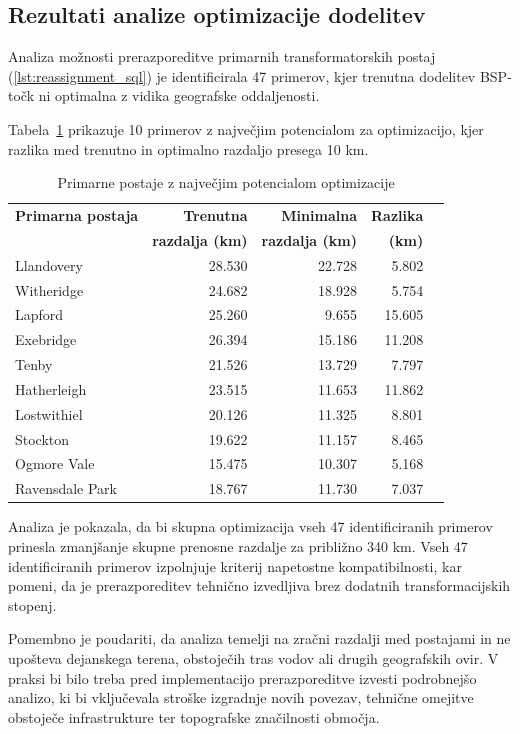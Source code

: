 \documentclass[a4paper,12pt,openright]{book}
\begin{document}
\subsection{Rezultati analize optimizacije dodelitev}

Analiza možnosti prerazporeditve primarnih transformatorskih postaj (\ref{lst:reassignment_sql}) je identificirala 47 primerov, kjer trenutna dodelitev BSP-točk ni optimalna z vidika geografske oddaljenosti.

Tabela~\ref{tab:reassignment_summary} prikazuje 10 primerov z največjim potencialom za optimizacijo, kjer razlika med trenutno in optimalno razdaljo presega 10 km.

\begin{table}[h]
\centering
\caption{Primarne postaje z največjim potencialom optimizacije}
\label{tab:reassignment_summary}
\begin{tabular}{lrrrr}
\hline
\textbf{Primarna postaja} & \textbf{Trenutna} & \textbf{Minimalna} & \textbf{Razlika} \\
 & \textbf{razdalja (km)} & \textbf{razdalja (km)} & \textbf{(km)} \\
\hline
Llandovery & 28.530 & 22.728 & 5.802 \\
Witheridge & 24.682 & 18.928 & 5.754 \\
Lapford & 25.260 & 9.655 & 15.605 \\
Exebridge & 26.394 & 15.186 & 11.208 \\
Tenby & 21.526 & 13.729 & 7.797 \\
Hatherleigh & 23.515 & 11.653 & 11.862 \\
Lostwithiel & 20.126 & 11.325 & 8.801 \\
Stockton & 19.622 & 11.157 & 8.465 \\
Ogmore Vale & 15.475 & 10.307 & 5.168 \\
Ravensdale Park & 18.767 & 11.730 & 7.037 \\
\hline
\end{tabular}
\end{table}

Analiza je pokazala, da bi skupna optimizacija vseh 47 identificiranih primerov prinesla zmanjšanje skupne prenosne razdalje za približno 340 km. Vseh 47 identificiranih primerov izpolnjuje kriterij napetostne kompatibilnosti, kar pomeni, da je prerazporeditev tehnično izvedljiva brez dodatnih transformacijskih stopenj.

Pomembno je poudariti, da analiza temelji na zračni razdalji med postajami in ne upošteva dejanskega terena, obstoječih tras vodov ali drugih geografskih ovir. V praksi bi bilo treba pred implementacijo prerazporeditve izvesti podrobnejšo analizo, ki bi vključevala stroške izgradnje novih povezav, tehnične omejitve obstoječe infrastrukture ter topografske značilnosti območja.
\end{document}
